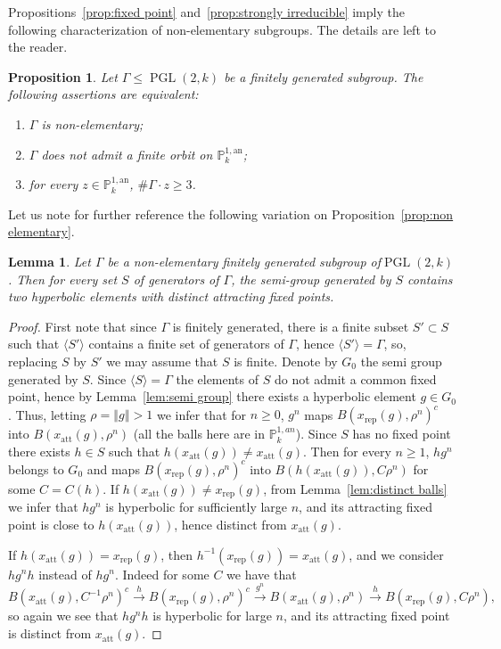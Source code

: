 \documentclass[11pt]{article}
\newtheorem{lemm}[theo]{Lemma}
\newtheorem{prop}[theo]{Proposition}
\theoremstyle{definition}
\numberwithin{equation}{section}
\numberwithin{figure}{section}
\numberwithin{table}{section}
\DeclareMathOperator{\PGL}{PGL}
\newcommand{\norm}[1]{\left\Vert#1\right\Vert}
\newcommand{\PP}{\mathbb{P}}
\newcommand{\att}{\mathrm{att}}
\newcommand{\rep}{\mathrm{rep}}
\newcommand{\PGLk}{\PGL(2, k)}
\newcommand{\inv}{^{-1}}
\begin{document}
Propositions~\ref{prop:fixed point} and~\ref{prop:strongly irreducible} imply the following characterization of non-elementary subgroups. The details are left to the reader.

\begin{prop}
Let $\Gamma\leq \PGLk$ be a finitely generated subgroup. The following assertions are equivalent:
\begin{enumerate}
\item $\Gamma$ is non-elementary;
\item $\Gamma$ does not admit a finite orbit on $\PP^{1, \mathrm{an}}_k$;
\item for every $z\in \PP^{1, \mathrm{an}}_k$, $\# \Gamma \cdot z\geq 3$.
\end{enumerate}
\end{prop}

Let us note for further reference the following variation on Proposition~\ref{prop:non elementary}.

\begin{lemm}\label{lem:proximal semi group}
Let $\Gamma$ be a non-elementary finitely generated subgroup of\linebreak $\PGLk$. Then for every set $S$ of generators of $\Gamma$, the semi-group generated by $S$ contains two hyperbolic elements with distinct attracting fixed points.
\end{lemm}

\begin{proof}
First note that since $\Gamma$ is finitely generated, there is a finite subset $S'\subset S$ such that $\langle S'\rangle$ contains a finite set of generators of $\Gamma$, hence $\langle S'\rangle = \Gamma$, so, replacing $S$ by $S'$ we may assume that $S$ is finite. Denote by $G_0$ the semi group generated by $S$. Since $\langle S\rangle = \Gamma$ the elements of $S$ do not admit a common fixed point, hence by Lemma~\ref{lem:semi group} there exists a hyperbolic element $g\in G_0$. Thus, letting $\rho = \norm{g}>1$ we infer that for $n\geq 0$, $g^n$ maps $B(x_\rep(g), \rho^n)^c$ into $B(x_\att(g), \rho^n)$ (all the balls here are in $\PP^{1, an}_k$). Since $S$ has no fixed point there exists $h\in S$ such that $h(x_\att(g))\neq x_\att(g)$. Then for every $n\geq 1$, $hg^n$ belongs to $G_0$ and maps $B(x_\rep(g), \rho^n)^c$ into $B(h(x_\att(g)), C\rho^n)$ for some $C = C(h)$. If $h(x_\att(g))\neq x_\rep(g)$, from Lemma~\ref{lem:distinct balls} we infer that $hg^n$ is hyperbolic for sufficiently large $n$, and its attracting fixed point is close to $h(x_\att(g))$, hence distinct from $x_\att(g)$.

If $h(x_\att(g))= x_\rep(g)$, then $h\inv(x_\rep(g)) =x_\att(g)$, and we consider $hg^n h$ instead of $hg^n$. Indeed for some $C$ we have that
\[
B(x_\att(g), C\inv\rho^n)^c\overset{h}\longrightarrow B(x_\rep(g), \rho^n)^c\overset{g^n}\longrightarrow B(x_\att(g), \rho^n)
\overset{h}\longrightarrow B(x_\rep(g), C \rho^n),
\]
so again we see that $hg^nh$ is hyperbolic for large $n$, and its attracting fixed point is distinct from $x_\att(g)$.
\end{proof}
\end{document}
